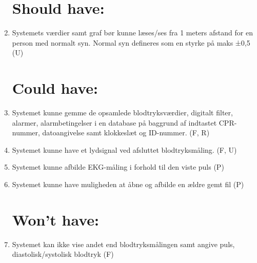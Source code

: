 \begin{enumerate}[4.1]
\section{Should have:}
		\item Systemets værdier samt graf bør kunne læses/ses fra 1 meters afstand for en person med normalt syn. Normal syn defineres som en styrke på maks ±0,5 (U)
	
\section{Could have:}
	\item Systemet kunne gemme de opsamlede blodtryksværdier, digitalt filter, alarmer, alarmbetingelser i en database på baggrund af indtastet CPR-nummer, datoangivelse samt klokkeslæt og ID-nummer. (F, R)
	\item Systemet kunne have et lydsignal ved afsluttet blodtryksmåling. (F, U)
	\item Systemet kunne afbilde EKG-måling i forhold til den viste puls (P)
	\item Systemet kunne have muligheden at åbne og afbilde en ældre gemt fil (P)
	

\section{Won't have:}
	\item Systemet kan ikke vise andet end blodtryksmålingen samt angive puls, diastolisk/systolisk blodtryk (F) 
\end{enumerate}